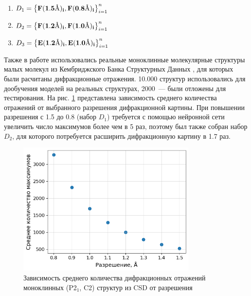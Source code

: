 \begin{enumerate}
\item $D_1 = \left\lbrace\mathbf{F(1.5\angstrom)_{i}, F(0.8\angstrom)_{i}}\right\rbrace^n_{i=1}$

\item $D_2 = \left\lbrace\mathbf{F(1.2\angstrom)_{i}, F(1.0\angstrom)_{i}}\right\rbrace^n_{i=1}$

\item $D_3 = \left\lbrace\mathbf{E(1.2\angstrom)_{i}, E(1.0\angstrom)_{i}}\right\rbrace^n_{i=1}$

\end{enumerate}

Также в работе использовались реальные моноклинные молекулярные структуры малых молекул из Кембриджского Банка Структурных Данных \cite{groom_cambridge_2014}, для которых были расчитаны дифракционные отражения. 10.000 структур использовались для дообучения моделей на реальных структурах, 2000~--- были отложены для тестирования. На рис. \ref{max_qty} представлена зависимость среднего количества отражений от выбранного разрешения дифракционной картины. При повышении разрешения с 1.5 \angstrom  до  0.8 \angstrom (набор $D_1$) требуется с помощью нейронной сети увеличить число максимумов более чем в 5 раз, поэтому был также собран набор $D_2$, для которого потребуется расширить дифракционную картину в 1.7 раз. 



\begin{figure}[H]
			\centering
            \includegraphics[width=0.8\textwidth]{figures/max_qty.png}
            \caption{Зависимость среднего количества дифракционных отражений моноклинных (P2$_1$, C2) структур из CSD от разрешения}
            \label{max_qty}
\end{figure}

